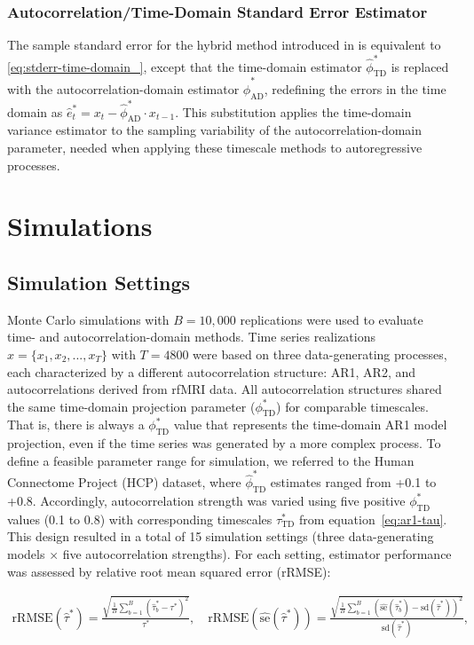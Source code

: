 \documentclass[9pt]{article}
\newcommand{\phitd}{\phi_{\scriptscriptstyle\text{TD}}}
\newcommand{\hatphitd}{\hat{\phi}^*_{\scriptscriptstyle\text{TD}}}
\newcommand{\tautd}{\tau_{\scriptscriptstyle\text{TD}}}
\newcommand{\hatphiad}{\hat{\phi}^*_{\scriptscriptstyle\text{AD}}}
\begin{document}
\subsubsection{Autocorrelation/Time-Domain Standard Error Estimator}\label{sec:stderr-autocorrelation/time-domain_}
The sample standard error for the hybrid method introduced in  is equivalent to \eqref{eq:stderr-time-domain_}, except that the time-domain estimator $\hatphitd$ is replaced with the autocorrelation-domain estimator $\hatphiad$, redefining the errors in the time domain as $\hat e_t^* = x_t - \hatphiad \cdot x_{t-1}$. This substitution applies the time-domain variance estimator to the sampling variability of the autocorrelation-domain parameter, needed when applying these timescale methods to autoregressive processes.

\section{Simulations}\label{sec:simulations}

\subsection{Simulation Settings}
Monte Carlo simulations with $B = 10,000$ replications were used to evaluate time- and autocorrelation-domain methods. Time series realizations $x = \{x_1, x_2, ..., x_T\}$ with $T=4800$ were based on three data-generating processes, each characterized by a different autocorrelation structure: AR1, AR2, and autocorrelations derived from rfMRI data. All autocorrelation structures shared the same time-domain projection parameter ($\phitd^*$) for comparable timescales. That is, there is always a $\phitd^*$ value that represents the time-domain AR1 model projection, even if the time series was generated by a more complex process. To define a feasible parameter range for simulation, we referred to the Human Connectome Project (HCP) dataset, where $\hatphitd$ estimates ranged from +0.1 to +0.8. Accordingly, autocorrelation strength was varied using five positive $\phitd^*$ values (0.1 to 0.8) with corresponding timescales $\tautd^*$ from equation~\eqref{eq:ar1-tau}. This design resulted in a total of 15 simulation settings (three data-generating models $\times$ five autocorrelation strengths). For each setting, estimator performance was assessed by relative root mean squared error (rRMSE):

\begin{align}
    \text{rRMSE}(\hat\tau^*) = \frac{\sqrt{\frac{1}{B} \sum_{b=1}^B (\hat\tau^*_b - \tau^*)^2}}{\tau^*}, \quad \text{rRMSE}(\widehat{\text{se}}(\hat\tau^*)) = \frac{\sqrt{\frac{1}{B} \sum_{b=1}^B \left(\widehat{\text{se}}(\hat\tau^*_b) - \text{sd}(\hat\tau^*)\right)^2}}{\text{sd}(\hat\tau^*)},
\end{align}
\end{document}
